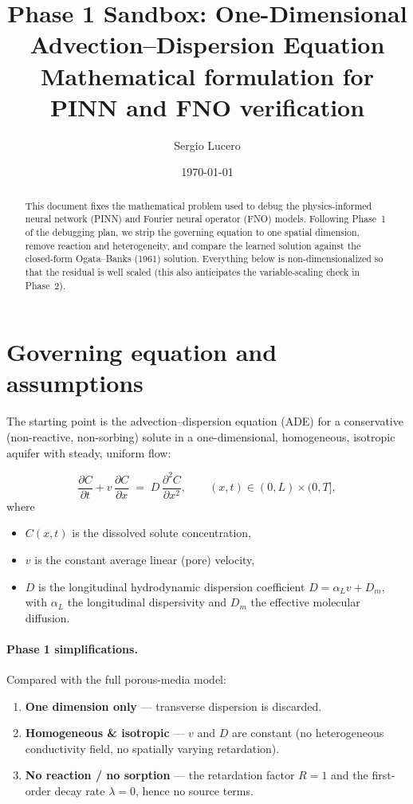 \documentclass[11pt]{article}
\title{Phase 1 Sandbox: One-Dimensional Advection--Dispersion Equation\\
\large Mathematical formulation for PINN and FNO verification}
\author{Sergio Lucero}
\date{\today}
\newcommand{\pdd}[2]{\frac{\partial #1}{\partial #2}}
\newcommand{\pddt}[2]{\frac{\partial^{2} #1}{\partial #2^{2}}}
\begin{document}
\maketitle

\begin{abstract}
This document fixes the mathematical problem used to debug the physics-informed
neural network (PINN) and Fourier neural operator (FNO) models. Following
Phase~1 of the debugging plan, we strip the governing equation to one spatial
dimension, remove reaction and heterogeneity, and compare the learned solution
against the closed-form Ogata--Banks (1961) solution. Everything below is
non-dimensionalized so that the residual is well scaled (this also anticipates
the variable-scaling check in Phase~2).
\end{abstract}

\section{Governing equation and assumptions}
\label{sec:governing}
The starting point is the advection--dispersion equation (ADE) for a
conservative (non-reactive, non-sorbing) solute in a one-dimensional,
homogeneous, isotropic aquifer with steady, uniform flow:

\begin{equation}
\label{eq:ade_dim}
\pdd{C}{t} + v\,\pdd{C}{x} \;=\; D\,\pddt{C}{x},
\qquad (x,t)\in(0,L)\times(0,T],
\end{equation}
where
\begin{itemize}
  \item $C(x,t)$ \;[$\si{M.L^{-3}}$] is the dissolved solute concentration,
  \item $v$ \;[$\si{L.T^{-1}}$] is the constant average linear (pore) velocity,
  \item $D$ \;[$\si{L^{2}.T^{-1}}$] is the longitudinal hydrodynamic dispersion
        coefficient $D=\alpha_L v + D_m$, with $\alpha_L$ the longitudinal
        dispersivity and $D_m$ the effective molecular diffusion.
\end{itemize}

\paragraph{Phase 1 simplifications.} Compared with the full porous-media model:
\begin{enumerate}
  \item \textbf{One dimension only} --- transverse dispersion is discarded.
  \item \textbf{Homogeneous \& isotropic} --- $v$ and $D$ are constant (no
        heterogeneous conductivity field, no spatially varying retardation).
  \item \textbf{No reaction / no sorption} --- the retardation factor $R=1$ and
        the first-order decay rate $\lambda=0$, hence no source terms.
\end{enumerate}
\end{document}
